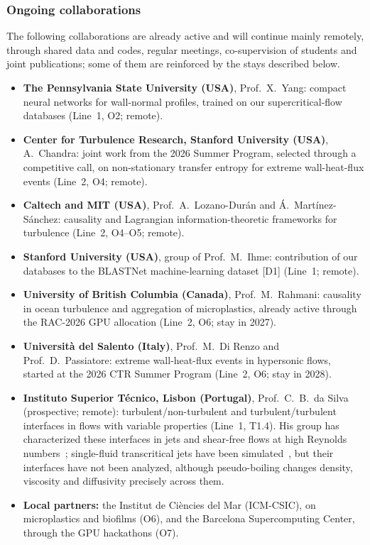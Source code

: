 \documentclass[11pt]{article}
\begin{document}
\subsubsection*{Ongoing collaborations}
The following collaborations are already active and will continue mainly remotely, through shared
data and codes, regular meetings, co-supervision of students and joint publications; some of them
are reinforced by the stays described below.
\begin{itemize}
  \item \textbf{The Pennsylvania State University (USA)}, Prof.\ X.\ Yang: compact neural networks
  for wall-normal profiles, trained on our supercritical-flow databases (Line~1, O2; remote).
  \item \textbf{Center for Turbulence Research, Stanford University (USA)}, A.\ Chandra: joint work
  from the 2026 Summer Program, selected through a competitive call, on non-stationary transfer
  entropy for extreme wall-heat-flux events (Line~2, O4; remote).
  \item \textbf{Caltech and MIT (USA)}, Prof.\ A.\ Lozano-Dur\'an and \'A.\ Mart\'inez-S\'anchez:
  causality and Lagrangian information-theoretic frameworks for turbulence (Line~2, O4--O5; remote).
  \item \textbf{Stanford University (USA)}, group of Prof.\ M.\ Ihme: contribution of our databases
  to the BLASTNet machine-learning dataset [D1] (Line~1; remote).
  \item \textbf{University of British Columbia (Canada)}, Prof.\ M.\ Rahmani: causality in ocean
  turbulence and aggregation of microplastics, already active through the RAC-2026 GPU allocation
  (Line~2, O6; stay in 2027).
  \item \textbf{Universit\`a del Salento (Italy)}, Prof.\ M.\ Di Renzo and Prof.\ D.\ Passiatore:
  extreme wall-heat-flux events in hypersonic flows, started at the 2026 CTR Summer Program
  (Line~2, O6; stay in 2028).
  \item \textbf{Instituto Superior T\'ecnico, Lisbon (Portugal)}, Prof.\ C.\ B.\ da Silva
  (prospective; remote): turbulent/non-turbulent and turbulent/turbulent interfaces in flows with
  variable properties (Line~1, T1.4). His group has characterized these interfaces in jets and
  shear-free flows at high Reynolds numbers~\cite{Silva2018,Alves2025}; single-fluid transcritical
  jets have been simulated~\cite{Lapenna2019,Ream2025}, but their interfaces have not been analyzed,
  although pseudo-boiling changes density, viscosity and diffusivity precisely across them.
  \item \textbf{Local partners:} the Institut de Ci\`encies del Mar (ICM-CSIC), on microplastics and
  biofilms (O6), and the Barcelona Supercomputing Center, through the GPU hackathons (O7).
\end{itemize}
\end{document}
